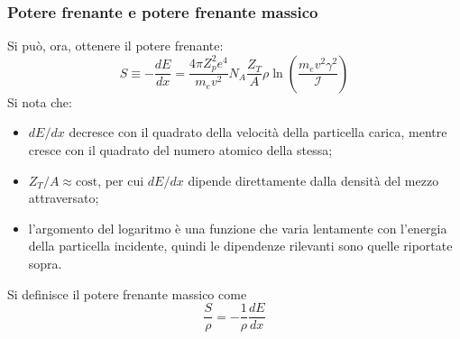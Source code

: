 \documentclass[11pt, a4paper]{scrartcl}
\theoremstyle{style}
\theoremstyle{style1}
\numberwithin{equation}{subsection}
\begin{document}
\subsubsection{Potere frenante e potere frenante massico}
Si pu\`o, ora, ottenere il potere frenante:
\begin{equation}
	S \equiv - \frac{d E}{d x}  = \frac{4\pi Z_p^2 e^4}{m_e v^2} N_A \frac{Z_T}{A} \rho  \ln \left(\frac{m_e v^2 \gamma^2}{\mathcal{I} }\right) 
\end{equation}
Si nota che:
\begin{itemize}
	\item $d E / dx$ decresce con il quadrato della velocit\`a della particella carica, mentre cresce con il quadrato del numero atomico della stessa;
	\item $Z_T / A \approx \text{cost}$, per cui $dE / dx$ dipende direttamente dalla densit\`a del mezzo attraversato;
	\item l'argomento del logaritmo \`e una funzione che varia lentamente con l'energia della particella incidente, quindi le dipendenze rilevanti sono quelle riportate sopra.
\end{itemize}
Si definisce il potere frenante massico come
\begin{equation}
	\frac{S}{\rho } =  - \frac{1}{\rho } \frac{d E}{d x} 
\end{equation}
\end{document}
